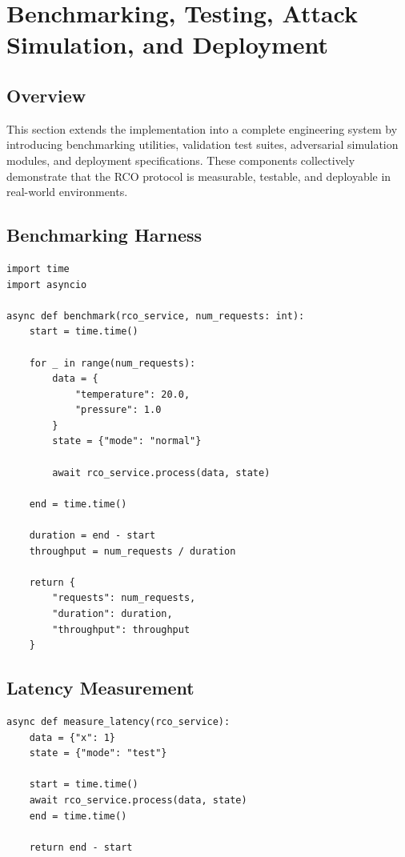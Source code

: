 \section{Benchmarking, Testing, Attack Simulation, and Deployment}

\subsection{Overview}

This section extends the implementation into a complete engineering system by introducing benchmarking utilities, validation test suites, adversarial simulation modules, and deployment specifications. These components collectively demonstrate that the RCO protocol is measurable, testable, and deployable in real-world environments.

\subsection{Benchmarking Harness}

\begin{verbatim}
import time
import asyncio

async def benchmark(rco_service, num_requests: int):
    start = time.time()

    for _ in range(num_requests):
        data = {
            "temperature": 20.0,
            "pressure": 1.0
        }
        state = {"mode": "normal"}

        await rco_service.process(data, state)

    end = time.time()

    duration = end - start
    throughput = num_requests / duration

    return {
        "requests": num_requests,
        "duration": duration,
        "throughput": throughput
    }
\end{verbatim}

\subsection{Latency Measurement}

\begin{verbatim}
async def measure_latency(rco_service):
    data = {"x": 1}
    state = {"mode": "test"}

    start = time.time()
    await rco_service.process(data, state)
    end = time.time()

    return end - start
\end{verbatim}


